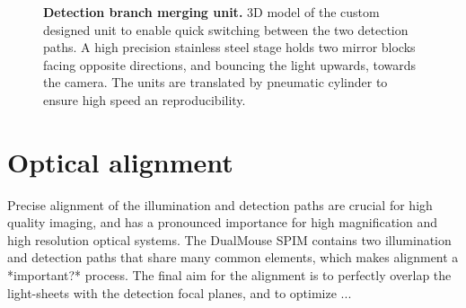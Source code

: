 \documentclass{diploma_style}
\begin{document}
\begin{figure}[htb]
\centering
\caption{\textbf{Detection branch merging unit.} 3D model of the custom designed unit to enable quick switching between the two detection paths. A high precision stainless steel stage holds two mirror blocks facing opposite directions, and bouncing the light upwards, towards the camera. The units are translated by  pneumatic cylinder to ensure high speed an reproducibility.}
\label{fig:DualMirror}
\end{figure}	


\section{Optical alignment}
Precise alignment of the illumination and detection paths are crucial for high quality imaging, and has a pronounced  importance for high magnification and high resolution optical systems. The DualMouse SPIM contains two illumination and detection paths that share many common elements, which makes alignment a *important?* process. The final aim for the alignment is to perfectly overlap the light-sheets with the detection focal planes, and to optimize ... 
\end{document}
